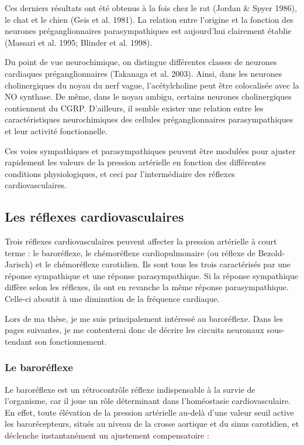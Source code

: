 \documentclass[a4paper,12pt,twoside]{report}
\begin{document}
Ces derniers résultats ont été obtenus à la fois chez le rat (Jordan \& Spyer 1986), le chat et le chien (Geis et al. 1981). La relation entre l’origine et la fonction des neurones préganglionnaires parasympathiques est aujourd’hui clairement établie (Massari et al. 1995; Blinder et al. 1998).

Du point de vue neurochimique, on distingue différentes classes de neurones cardiaques préganglionnaires (Takanaga et al. 2003). Ainsi, dans les neurones cholinergiques du noyau du nerf vague, l’acétylcholine peut être colocalisée avec la NO synthase. De même, dans le noyau ambigu, certains neurones cholinergiques contiennent du CGRP. D’ailleurs, il semble exister une relation entre les caractéristiques neurochimiques des cellules préganglionnaires parasympathiques et leur activité fonctionnelle.

Ces voies sympathiques et parasympathiques peuvent être modulées pour ajuster rapidement les valeurs de la pression artérielle en fonction des différentes conditions physiologiques, et ceci par l’intermédiaire des réflexes cardiovasculaires.

\subsection{Les réflexes cardiovasculaires }
\label{Réflèxes cardiovasculaires}

Trois réflexes cardiovasculaires peuvent affecter la pression artérielle à court terme : le baroréflexe, le chémoréflexe cardiopulmonaire (ou réflexe de Bezold-Jarisch) et le chémoréflexe carotidien. Ils sont tous les trois caractérisés par une réponse sympathique et une réponse parasympathique. Si la réponse sympathique diffère selon les réflexes, ils ont en revanche la même réponse parasympathique. Celle-ci aboutit à une diminution de la fréquence cardiaque. 

Lors de ma thèse, je me suis principalement intéressé au baroréflexe. Dans les pages suivantes, je me contenterai donc de décrire les circuits neuronaux sous-tendant son fonctionnement. 

\subsubsection{Le baroréflexe}

Le baroréflexe est un rétrocontrôle réflexe indispensable à la survie de l’organisme, car il joue un rôle déterminant dans l’homéostasie cardiovasculaire. En effet, toute élévation de la pression artérielle au-delà d’une valeur seuil active les barorécepteurs, situés au niveau de la crosse aortique et du sinus carotidien, et déclenche instantanément un ajustement compensatoire : 
\end{document}
